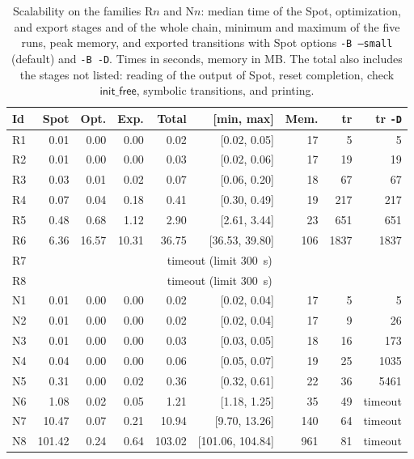 \begin{table}[t]
\centering
\caption{Scalability on the families R$n$ and N$n$: median time of the Spot, optimization, and export stages and of the whole chain, minimum and maximum of the five runs, peak memory, and exported transitions with Spot options \texttt{-B --small} (default) and \texttt{-B -D}.  Times in seconds, memory in MB.  The total also includes the stages not listed: reading of the output of Spot, reset completion, check $\mathsf{init\_free}$, symbolic transitions, and printing.}
\label{tab:scaling}
\footnotesize
\setlength{\tabcolsep}{3pt}
\begin{tabular}{@{}lrrrrrrrr@{}}
\toprule
Id & Spot & Opt. & Exp. & Total & [min, max] & Mem. & tr & tr \texttt{-D}\\
\midrule
R1 & 0.01 & 0.00 & 0.00 & 0.02 & [0.02, 0.05] & 17 & 5 & 5\\
R2 & 0.01 & 0.00 & 0.00 & 0.03 & [0.02, 0.06] & 17 & 19 & 19\\
R3 & 0.03 & 0.01 & 0.02 & 0.07 & [0.06, 0.20] & 18 & 67 & 67\\
R4 & 0.07 & 0.04 & 0.18 & 0.41 & [0.30, 0.49] & 19 & 217 & 217\\
R5 & 0.48 & 0.68 & 1.12 & 2.90 & [2.61, 3.44] & 23 & 651 & 651\\
R6 & 6.36 & 16.57 & 10.31 & 36.75 & [36.53, 39.80] & 106 & 1837 & 1837\\
R7 & \multicolumn{8}{c}{timeout (limit 300~s)}\\
R8 & \multicolumn{8}{c}{timeout (limit 300~s)}\\
N1 & 0.01 & 0.00 & 0.00 & 0.02 & [0.02, 0.04] & 17 & 5 & 5\\
N2 & 0.01 & 0.00 & 0.00 & 0.02 & [0.02, 0.04] & 17 & 9 & 26\\
N3 & 0.01 & 0.00 & 0.00 & 0.03 & [0.03, 0.05] & 18 & 16 & 173\\
N4 & 0.04 & 0.00 & 0.00 & 0.06 & [0.05, 0.07] & 19 & 25 & 1035\\
N5 & 0.31 & 0.00 & 0.02 & 0.36 & [0.32, 0.61] & 22 & 36 & 5461\\
N6 & 1.08 & 0.02 & 0.05 & 1.21 & [1.18, 1.25] & 35 & 49 & timeout\\
N7 & 10.47 & 0.07 & 0.21 & 10.94 & [9.70, 13.26] & 140 & 64 & timeout\\
N8 & 101.42 & 0.24 & 0.64 & 103.02 & [101.06, 104.84] & 961 & 81 & timeout\\
\bottomrule
\end{tabular}
\end{table}
